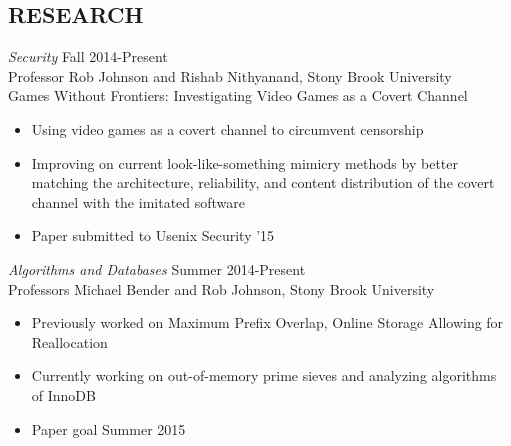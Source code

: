 \documentclass[margin]{res}
\begin{document}
\begin{resume}
 

               
\section{RESEARCH}
			  {\sl Security} \hfill		Fall 2014-Present \\
			  Professor Rob Johnson and Rishab Nithyanand, Stony Brook University \\
			  Games Without Frontiers: Investigating Video Games as a Covert Channel \\
                \begin{itemize} \itemsep -2pt
			  \item Using video games as a covert channel to circumvent censorship
			  \item Improving on current look-like-something mimicry methods by better matching the architecture, reliability, and content distribution of the covert channel with the imitated software
			  \item Paper submitted to Usenix  Security '15
			  \end{itemize}

			  {\sl Algorithms and Databases} \hfill		Summer 2014-Present \\
			  Professors Michael Bender and Rob Johnson, Stony Brook University\\
                \begin{itemize} \itemsep -2pt
			  \item Previously worked on Maximum Prefix Overlap, Online Storage Allowing for Reallocation 
			  \item Currently working on out-of-memory prime sieves and analyzing algorithms of InnoDB
			  \item Paper goal Summer 2015 
			  \end{itemize}
			  

\end{resume}
\end{document}
